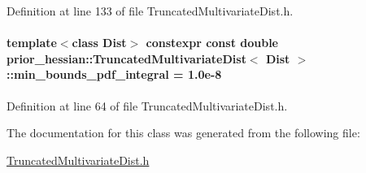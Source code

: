 Definition at line 133 of file Truncated\+Multivariate\+Dist.\+h.

\paragraph[{\texorpdfstring{min\+\_\+bounds\+\_\+pdf\+\_\+integral}{min_bounds_pdf_integral}}]{\setlength{\rightskip}{0pt plus 5cm}template$<$class Dist$>$ constexpr const double {\bf prior\+\_\+hessian\+::\+Truncated\+Multivariate\+Dist}$<$ Dist $>$\+::min\+\_\+bounds\+\_\+pdf\+\_\+integral = 1.\+0e-\/8\hspace{0.3cm}{\ttfamily [static]}}\hypertarget{classprior__hessian_1_1TruncatedMultivariateDist_a174f1cebf918193f5b10b4ecfa3740ec}{}\label{classprior__hessian_1_1TruncatedMultivariateDist_a174f1cebf918193f5b10b4ecfa3740ec}


Definition at line 64 of file Truncated\+Multivariate\+Dist.\+h.



The documentation for this class was generated from the following file\+:\begin{DoxyCompactItemize}
\item 
\hyperlink{TruncatedMultivariateDist_8h}{Truncated\+Multivariate\+Dist.\+h}\end{DoxyCompactItemize}
